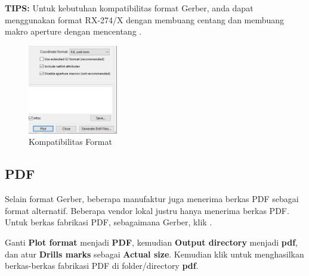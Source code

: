 \documentclass[12pt]{book}
\begin{document}
	\textbf{TIPS:} Untuk kebutuhan kompatibilitas format Gerber, anda dapat menggunakan format RX-274/X dengan membuang centang 
	dan membuang makro aperture dengan mencentang .

	\begin{figure}[!ht]
		\centering
		\includegraphics[width=0.35\textwidth]{images/fab/fab_0_alt}
		\caption{Kompatibilitas Format}
	\end{figure}

	\newpage
	\subsection{PDF}

	Selain format Gerber, beberapa manufaktur juga menerima berkas PDF sebagai format alternatif.
	Beberapa vendor lokal justru hanya menerima berkas PDF.
	Untuk berkas fabrikasi PDF, sebagaimana Gerber, klik .

	Ganti \textbf{Plot format} menjadi \textbf{PDF},
	kemudian \textbf{Output directory} menjadi \textbf{pdf},
	dan atur \textbf{Drills marks} sebagai \textbf{Actual size}.
	Kemudian klik  untuk menghasilkan berkas-berkas fabrikasi PDF di folder/directory \textbf{pdf}.
\end{document}
